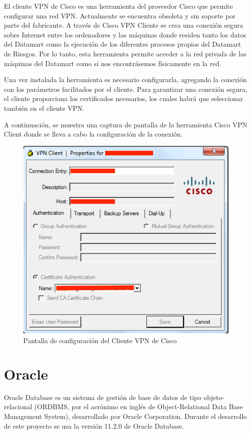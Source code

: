 \documentclass[a4paper, 12pt]{book}
\begin{document}
El cliente VPN de Cisco es una herramienta del proveedor Cisco que permite configurar una red VPN. Actualmente se encuentra obsoleta y sin soporte por parte del fabricante. A través de Cisco VPN Cliente se crea una conexión segura sobre Internet entre los ordenadores y las máquinas donde residen tanto los datos del Datamart como la ejecución de los diferentes procesos propios del Datamart de Riesgos. Por lo tanto, esta herramienta permite acceder a la red privada de las máquinas del Datamart como si nos encontrásemos físicamente en la red.

Una vez instalada la herramienta es necesario configurarla, agregando la conexión con los parámetros facilitados por el cliente. Para garantizar una conexión segura, el cliente proporciona los certificados necesarios, los cuales habrá que seleccionar también en el cliente VPN.

A continuación, se muestra una captura de pantalla de la herramienta Cisco VPN Client donde se lleva a cabo la configuración de la conexión.

\begin{figure}
   \centering
   \includegraphics[width=12cm, keepaspectratio]{img/ciscovpnclient}
   \caption{Pantalla de configuración del Cliente VPN de Cisco}
   \label{fig:CiscoVpnClient_Config}
\end{figure}

\section{Oracle}
\label{sec:Oracle}
Oracle Database es un sistema de gestión de base de datos de tipo objeto-relacional (ORDBMS, por el acrónimo en inglés de Object-Relational Data Base Management System), desarrollado por Oracle Corporation. Durante el desarrollo de este proyecto se usa la versión 11.2.0 de Oracle Database.
\end{document}
